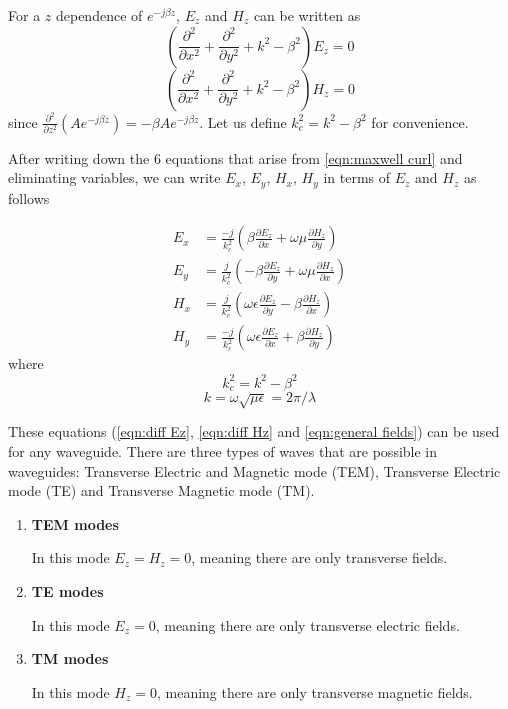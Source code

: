 For a $z$ dependence of $e^{-j\beta z}$, $E_z$ and $H_z$ can be written as
\begin{equation}
\left(\frac{\partial^2}{\partial x^2}+\frac{\partial^2}{\partial y^2}+k^2-\beta^2\right)E_z=0
\label{eqn:diff Ez}
\end{equation}
\begin{equation}
\left(\frac{\partial^2}{\partial x^2}+\frac{\partial^2}{\partial y^2}+k^2-\beta^2\right)H_z=0
\label{eqn:diff Hz}
\end{equation}
since $\frac{\partial^2}{\partial z^2}\left(Ae^{-j\beta z}\right)=-\beta Ae^{-j\beta z}$.
Let us define $k_c^2=k^2-\beta^2$ for convenience.

After writing down the 6 equations that arise from \ref{eqn:maxwell curl} and eliminating variables, we can write $E_x$, $E_y$, $H_x$, $H_y$ in terms of $E_z$ and $H_z$ as follows

\begin{subequations}
\label{eqn:general fields}
\begin{align}
E_x& =\frac{-j}{k_c^2}\left(\beta\frac{\partial E_z}{\partial x} + \omega\mu\frac{\partial H_z}{\partial y}\right)
\label{eqn:Ex}
\\
E_y& =\frac{j}{k_c^2}\left(-\beta\frac{\partial E_z}{\partial y}+ \omega\mu\frac{\partial H_z}{\partial x}\right)
\label{eqn:Ey}
\\
H_x& =\frac{j}{k_c^2}\left(\omega\epsilon\frac{\partial E_z}{\partial y}-\beta\frac{\partial H_z}{\partial x}\right)
\label{eqn:Hx}
\\
H_y& =\frac{-j}{k_c^2}\left(\omega\epsilon\frac{\partial E_z}{\partial x}+\beta\frac{\partial H_z}{\partial y}\right)
\label{eqn:Hy}
\end{align}
\end{subequations}
where
\begin{equation}
k_c^2=k^2-\beta^2
\label{eqn:kc definition}
\end{equation}
\begin{equation}
k=\omega \sqrt{\mu\epsilon}=2\pi/\lambda
\label{eqn:k=2pi/lambda}
\end{equation}

These equations (\ref{eqn:diff Ez}, \ref{eqn:diff Hz} and \ref{eqn:general fields}) can be used for any waveguide. There are three types of waves that are possible in waveguides: Transverse Electric and Magnetic mode (TEM), Transverse Electric mode (TE) and Transverse Magnetic mode (TM).

\begin{enumerate}
\item \textbf{TEM modes}

In this mode $E_z=H_z=0$, meaning there are only transverse fields.
\item \textbf{TE modes}

In this mode $E_z=0$, meaning there are only transverse electric fields.
\item \textbf{TM modes}

In this mode $H_z=0$, meaning there are only transverse magnetic fields.
\end{enumerate}

